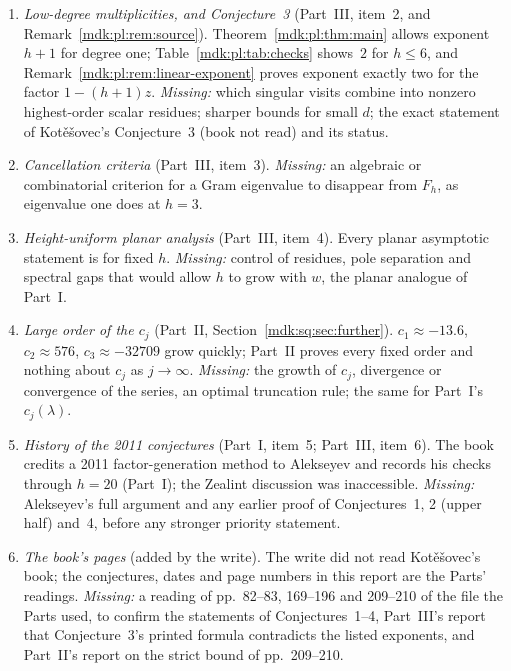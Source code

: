 \documentclass[11pt,letterpaper]{article}
\numberwithin{equation}{section}
\theoremstyle{remark}\newtheorem{remark}[theorem]{Remark}
\begin{document}
\begin{enumerate}[leftmargin=1.6em]
\item\label{mdk:q:lowdeg} \emph{Low-degree multiplicities, and Conjecture~3} (Part~III, item~2, and Remark~\ref{mdk:pl:rem:source}). Theorem~\ref{mdk:pl:thm:main} allows exponent $h+1$ for degree one; Table~\ref{mdk:pl:tab:checks} shows~$2$ for $h\le6$, and Remark~\ref{mdk:pl:rem:linear-exponent} proves exponent exactly two for the factor $1-(h+1)z$. \emph{Missing:} which singular visits combine into nonzero highest-order scalar residues; sharper bounds for small $d$; the exact statement of Kot\v e\v sovec's Conjecture~3 (book not read) and its status.
\item\label{mdk:q:cancel} \emph{Cancellation criteria} (Part~III, item~3). \emph{Missing:} an algebraic or combinatorial criterion for a Gram eigenvalue to disappear from $F_h$, as eigenvalue one does at $h=3$.
\item\label{mdk:q:uniform} \emph{Height-uniform planar analysis} (Part~III, item~4). Every planar asymptotic statement is for fixed $h$. \emph{Missing:} control of residues, pole separation and spectral gaps that would allow $h$ to grow with $w$, the planar analogue of Part~I.
\item\label{mdk:q:largeorder} \emph{Large order of the $c_j$} (Part~II, Section~\ref{mdk:sq:sec:further}). $c_1\approx-13.6$, $c_2\approx576$, $c_3\approx-32709$ grow quickly; Part~II proves every fixed order and nothing about $c_j$ as $j\to\infty$. \emph{Missing:} the growth of $c_j$, divergence or convergence of the series, an optimal truncation rule; the same for Part~I's $c_j(\lambda)$.
\item\label{mdk:q:history} \emph{History of the 2011 conjectures} (Part~I, item~5; Part~III, item~6). The book credits a 2011 factor-generation method to Alekseyev and records his checks through $h=20$ (Part~I); the Zealint discussion was inaccessible. \emph{Missing:} Alekseyev's full argument and any earlier proof of Conjectures~1, 2 (upper half) and~4, before any stronger priority statement.
\item\label{mdk:q:book} \emph{The book's pages} (added by the write). The write did not read Kot\v e\v sovec's book; the conjectures, dates and page numbers in this report are the Parts' readings. \emph{Missing:} a reading of pp.~82--83, 169--196 and 209--210 of the file the Parts used, to confirm the statements of Conjectures~1--4, Part~III's report that Conjecture~3's printed formula contradicts the listed exponents, and Part~II's report on the strict bound of pp.~209--210.

\end{enumerate}
\end{document}
